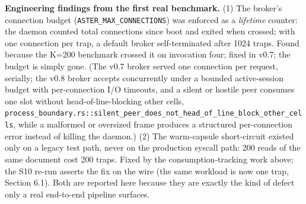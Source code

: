 \documentclass[
  11pt,
]{article}
\begin{document}
\textbf{Engineering findings from the first real benchmark.} (1) The broker's connection budget (\texttt{ASTER\_MAX\_CONNECTIONS}) was enforced as a \emph{lifetime} counter: the daemon counted total connections since boot and exited when crossed; with one connection per trap, a default broker self-terminated after 1024 traps. Found because the K=200 benchmark crossed it on invocation four; fixed in v0.7; the budget is simply gone. (The v0.7 broker served one connection per request, serially; the v0.8 broker accepts concurrently under a bounded active-session budget with per-connection I/O timeouts, and a silent or hostile peer consumes one slot without head-of-line-blocking other cells, \texttt{process\_boundary.rs::silent\_peer\_does\_not\_head\_of\_line\_block\_other\_cells}, while a malformed or oversized frame produces a structured per-connection error instead of killing the daemon.) (2) The warm-capsule short-circuit existed only on a legacy test path, never on the production syscall path: 200 reads of the same document cost 200 traps. Fixed by the consumption-tracking work above; the S10 re-run asserts the fix on the wire (the same workload is now one trap, Section 6.1). Both are reported here because they are exactly the kind of defect only a real end-to-end pipeline surfaces.
\end{document}
